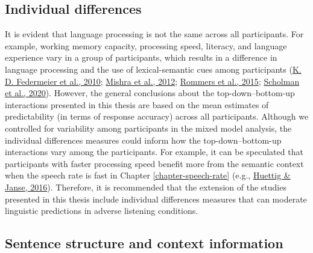 \documentclass[a4paper, nobind]{templates/ociamthesis}
\begin{document}
\hypertarget{individual-differences}{%
\subsection{Individual differences}\label{individual-differences}}

It is evident that language processing is not the same across all participants.
For example, working memory capacity, processing speed, literacy, and language experience vary in a group of participants,
which results in a difference in language processing and the use of lexical-semantic cues among participants (\protect\hyperlink{ref-Federmeier2010}{K. D. Federmeier et al., 2010}; \protect\hyperlink{ref-Mishra2012}{Mishra et al., 2012}; \protect\hyperlink{ref-Rommers2015}{Rommers et al., 2015}; \protect\hyperlink{ref-Scholman2020}{Scholman et al., 2020}).
However, the general conclusions about the top-down--bottom-up interactions presented in this thesis are based on the mean estimates of predictability (in terms of response accuracy) across all participants.
Although we controlled for variability among participants in the mixed model analysis,
the individual differences measures could inform how the top-down--bottom-up interactions vary among the participants.
For example, it can be speculated that participants with faster processing speed benefit more from the semantic context when the speech rate is fast in Chapter \ref{chapter-speech-rate} (e.g., \protect\hyperlink{ref-Huettig2016a}{Huettig \& Janse, 2016}).
Therefore, it is recommended that the extension of the studies presented in this thesis include individual differences measures that can moderate linguistic predictions in adverse listening conditions.

\hypertarget{sentence-structure-and-context-information}{%
\subsection{Sentence structure and context information}\label{sentence-structure-and-context-information}}
\end{document}
